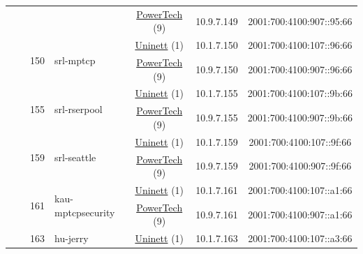 \begin{small}
\begin{center}
\begin{longtable}{|c|c|c|c|c|c|c|c|}
  &  &  &  & \multicolumn{2}{|c|}{\tiny{\href{http://www.powertech.no}{PowerTech} (9)}} & \tiny{10.9.7.149} & \tiny{2001:700:4100:907::95:66} \\* \cline{3-3}\cline{4-4}\cline{5-5}\cline{6-6}\cline{7-7}\cline{8-8}
  &  & \multirow{2}{*}{\tiny{150}} & \multicolumn{1}{|l|}{\multirow{2}{*}{\tiny{srl-mptcp}}} & \multicolumn{2}{|c|}{\tiny{\href{https://www.uninett.no}{Uninett} (1)}} & \tiny{10.1.7.150} & \tiny{2001:700:4100:107::96:66} \\* \cline{5-5}\cline{6-6}\cline{7-7}\cline{8-8}
  &  &  &  & \multicolumn{2}{|c|}{\tiny{\href{http://www.powertech.no}{PowerTech} (9)}} & \tiny{10.9.7.150} & \tiny{2001:700:4100:907::96:66} \\* \cline{3-3}\cline{4-4}\cline{5-5}\cline{6-6}\cline{7-7}\cline{8-8}
  &  & \multirow{2}{*}{\tiny{155}} & \multicolumn{1}{|l|}{\multirow{2}{*}{\tiny{srl-rserpool}}} & \multicolumn{2}{|c|}{\tiny{\href{https://www.uninett.no}{Uninett} (1)}} & \tiny{10.1.7.155} & \tiny{2001:700:4100:107::9b:66} \\* \cline{5-5}\cline{6-6}\cline{7-7}\cline{8-8}
  &  &  &  & \multicolumn{2}{|c|}{\tiny{\href{http://www.powertech.no}{PowerTech} (9)}} & \tiny{10.9.7.155} & \tiny{2001:700:4100:907::9b:66} \\* \cline{3-3}\cline{4-4}\cline{5-5}\cline{6-6}\cline{7-7}\cline{8-8}
  &  & \multirow{2}{*}{\tiny{159}} & \multicolumn{1}{|l|}{\multirow{2}{*}{\tiny{srl-seattle}}} & \multicolumn{2}{|c|}{\tiny{\href{https://www.uninett.no}{Uninett} (1)}} & \tiny{10.1.7.159} & \tiny{2001:700:4100:107::9f:66} \\* \cline{5-5}\cline{6-6}\cline{7-7}\cline{8-8}
  &  &  &  & \multicolumn{2}{|c|}{\tiny{\href{http://www.powertech.no}{PowerTech} (9)}} & \tiny{10.9.7.159} & \tiny{2001:700:4100:907::9f:66} \\* \cline{3-3}\cline{4-4}\cline{5-5}\cline{6-6}\cline{7-7}\cline{8-8}
  &  & \multirow{2}{*}{\tiny{161}} & \multicolumn{1}{|l|}{\multirow{2}{*}{\tiny{kau-mptcpsecurity}}} & \multicolumn{2}{|c|}{\tiny{\href{https://www.uninett.no}{Uninett} (1)}} & \tiny{10.1.7.161} & \tiny{2001:700:4100:107::a1:66} \\* \cline{5-5}\cline{6-6}\cline{7-7}\cline{8-8}
  &  &  &  & \multicolumn{2}{|c|}{\tiny{\href{http://www.powertech.no}{PowerTech} (9)}} & \tiny{10.9.7.161} & \tiny{2001:700:4100:907::a1:66} \\* \cline{3-3}\cline{4-4}\cline{5-5}\cline{6-6}\cline{7-7}\cline{8-8}
  &  & \multirow{2}{*}{\tiny{163}} & \multicolumn{1}{|l|}{\multirow{2}{*}{\tiny{hu-jerry}}} & \multicolumn{2}{|c|}{\tiny{\href{https://www.uninett.no}{Uninett} (1)}} & \tiny{10.1.7.163} & \tiny{2001:700:4100:107::a3:66} \\* \cline{5-5}\cline{6-6}\cline{7-7}\cline{8-8}

\end{longtable}
\end{center}
\end{small}
